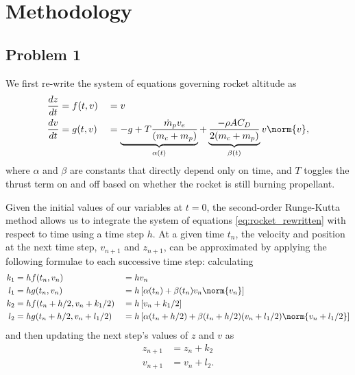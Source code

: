 \documentclass[12pt]{article}
\begin{document}
\section{Methodology}

\subsection{Problem 1}

We first re-write the system of equations governing rocket altitude as
\begin{equation}
\begin{aligned}
\frac{dz}{dt} &= f(t,v) &&= v
\\
\frac{dv}{dt} &= g(t,v) &&= \underbrace{-g + T \frac{\dot{m}_p v_e}{(m_c + m_p)}}_{\alpha(t)} + \underbrace{\frac{- \rho A C_D}{2 (m_c + m_p)}}_{\beta(t)} v \norm{v}
,
\end{aligned}
\label{eq:rocket_rewritten}
\end{equation}
where $\alpha$ and $\beta$ are constants that directly depend only on time, and $T$ toggles the thrust term on and off based on whether the rocket is still burning propellant.

Given the initial values of our variables at $t=0$, the second-order Runge-Kutta method allows us to integrate the system of equations \eqref{eq:rocket_rewritten} with respect to time using a time step $h$. At a given time $t_n$, the velocity and position at the next time step, $v_{n+1}$ and $z_{n+1}$, can be approximated by applying the following formulae to each successive time step: calculating
\begin{equation}
\begin{aligned}
k_1 &= h f(t_n,v_n) &&= h v_n
\\
l_1 &= h g(t_n,v_n) &&= h \left[ \alpha(t_n) + \beta(t_n) v_n \norm{v_n} \right]
\\
k_2 &= h f(t_n + h/2, v_n + k_1 / 2) &&= h \left[ v_n + k_1/2\right]
\\
l_2 &= h g(t_n + h/2, v_n + l_1 / 2) &&= h \left[ \alpha(t_n + h/2) + \beta(t_n + h/2) (v_n + l_1 / 2) \norm{v_n + l_1 / 2} \right]
\end{aligned}
\end{equation}
and then updating the next step's values of $z$ and $v$ as
\begin{equation}
\begin{aligned}
z_{n+1} &= z_n + k_2
\\
v_{n+1} &= v_n + l_2
.
\end{aligned}
\end{equation}
\end{document}
